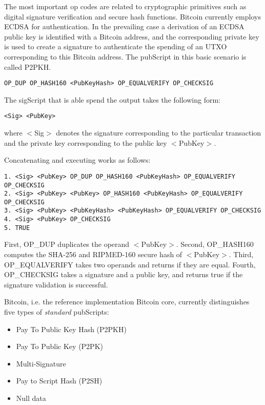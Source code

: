 The most important op codes are related to cryptographic primitives such as digital signature verification and secure hash functions. Bitcoin currently employs \ac{ECDSA} for authentication. In the prevailing case a derivation of an \ac{ECDSA} public key is identified with a Bitcoin address, and the corresponding private key is used to create a signature to authenticate the spending of an \ac{UTXO} corresponding to this Bitcoin address. 
The pubScript in this basic scenario is called \ac{P2PKH}.

\begin{lstlisting}
OP_DUP OP_HASH160 <PubKeyHash> OP_EQUALVERIFY OP_CHECKSIG
\end{lstlisting}

The sigScript that is able spend the output takes the following form:

\begin{lstlisting}
<Sig> <PubKey>
\end{lstlisting}

where $<$Sig$>$ denotes the signature corresponding to the particular transaction and the private key corresponding to the public key $<$PubKey$>$.

Concatenating and executing works as follows:

\begin{lstlisting}[breaklines]
1. <Sig> <PubKey> OP_DUP OP_HASH160 <PubKeyHash> OP_EQUALVERIFY OP_CHECKSIG
2. <Sig> <PubKey> <PubKey> OP_HASH160 <PubKeyHash> OP_EQUALVERIFY OP_CHECKSIG
3. <Sig> <PubKey> <PubKeyHash> <PubKeyHash> OP_EQUALVERIFY OP_CHECKSIG
4. <Sig> <PubKey> OP_CHECKSIG
5. TRUE
\end{lstlisting}

First, OP\_DUP duplicates the operand $<$PubKey$>$. Second, OP\_HASH160 computes the SHA-256 and RIPMED-160 secure hash of $<$PubKey$>$. Third, OP\_EQUALVERIFY takes two operands and returns if they are equal. Fourth, OP\_CHECKSIG takes a signature and a public key, and returns true if the signature validation is successful. 

Bitcoin, i.e. the reference implementation Bitcoin core, currently distinguishes five types of \emph{standard} pubScripts:

\begin{itemize}
\item Pay To Public Key Hash (P2PKH)
\item Pay To Public Key (P2PK)
\item Multi-Signature 
\item Pay to Script Hash (P2SH)
\item Null data
\end{itemize}

